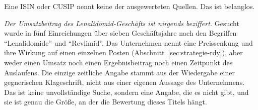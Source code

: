Eine ISIN oder CUSIP nennt keine der ausgewerteten Quellen. Das ist
belanglos.

\emph{Der Umsatzbeitrag des Lenalidomid-Gesch\"afts ist nirgends beziffert.}
Gesucht wurde in f\"unf Einreichungen \"uber sieben Gesch\"aftsjahre nach den
Begriffen \enquote{Lenalidomide} und \enquote{Revlimid}. Das Unternehmen
nennt eine Preissenkung und ihre Wirkung auf einen einzelnen Posten
(Abschnitt~\ref{sec:strategie-rdy}), aber weder einen Umsatz noch einen
Ergebnisbeitrag noch einen Zeitpunkt des Auslaufens. Die einzige zeitliche
Angabe stammt aus der Wiedergabe einer gegnerischen Klageschrift, nicht aus
einer eigenen Aussage des Unternehmens.
Das ist keine unvollst\"andige Suche, sondern eine Angabe, die es nicht gibt,
und sie ist genau die Gr\"o{\ss}e, an der die Bewertung dieses Titels
h\"angt.
